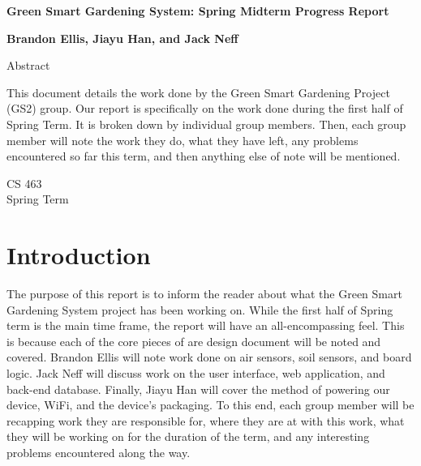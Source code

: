 \documentclass[IEEEtran,letterpaper,10pt,titlepage,fleqn,draftclsnofoot,onecolumn]{article}
\begin{document}
\begin{titlepage}
  \begin{center}
    \vspace{1cm}
    
    \huge
    \textbf{Green Smart Gardening System: Spring Midterm Progress Report}
    
    \vspace{1.5cm}
    
    \large
        \textbf{Brandon Ellis, Jiayu Han, and Jack Neff}
    
    \vspace{5cm}
    
    Abstract
    
    \normalsize
    This document details the work done by the Green Smart Gardening Project (GS2) group. Our report is specifically on the work done during the first half of Spring Term. It is broken down by individual group members. Then, each group member will note the work they do, what they have left, any problems encountered so far this term, and then anything else of note will be mentioned.
    
    \vfill
    
    \large
        CS 463\\
        Spring Term\\
    \end{center}
\end{titlepage}

\section{Introduction}

The purpose of this report is to inform the reader about what the Green Smart Gardening System project has been working on. While the first half of Spring term is the main time frame, the report will have an all-encompassing feel. This is because each of the core pieces of are design document will be noted and covered. Brandon Ellis will note work done on air sensors, soil sensors, and board logic. Jack Neff will discuss work on the user interface, web application, and back-end database. Finally, Jiayu Han will cover the method of powering our device, WiFi, and the device’s packaging. To this end, each group member will be recapping work they are responsible for, where they are at with this work, what they will be working on for the duration of the term, and any interesting problems encountered along the way.
\end{document}
